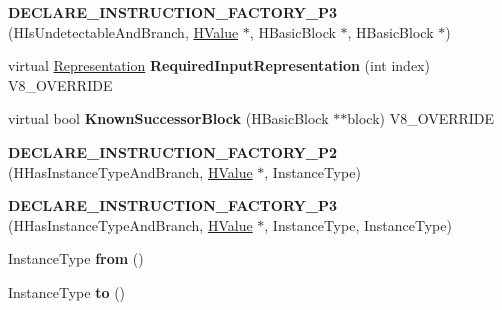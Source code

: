 \begin{DoxyCompactItemize}
\item 
\hypertarget{classv8_1_1internal_1_1_v8___f_i_n_a_l_adf4523d37246896be894f3f44d9a8fee}{}{\bfseries D\+E\+C\+L\+A\+R\+E\+\_\+\+I\+N\+S\+T\+R\+U\+C\+T\+I\+O\+N\+\_\+\+F\+A\+C\+T\+O\+R\+Y\+\_\+\+P3} (H\+Is\+Undetectable\+And\+Branch, \hyperlink{classv8_1_1internal_1_1_h_value}{H\+Value} $\ast$, H\+Basic\+Block $\ast$, H\+Basic\+Block $\ast$)\label{classv8_1_1internal_1_1_v8___f_i_n_a_l_adf4523d37246896be894f3f44d9a8fee}

\item 
\hypertarget{classv8_1_1internal_1_1_v8___f_i_n_a_l_a6c6d1f37f40b113d8f4062f1ffff7215}{}virtual \hyperlink{classv8_1_1internal_1_1_representation}{Representation} {\bfseries Required\+Input\+Representation} (int index) V8\+\_\+\+O\+V\+E\+R\+R\+I\+D\+E\label{classv8_1_1internal_1_1_v8___f_i_n_a_l_a6c6d1f37f40b113d8f4062f1ffff7215}

\item 
\hypertarget{classv8_1_1internal_1_1_v8___f_i_n_a_l_a85ba341b22db01ee3cd7145d9f8e9b99}{}virtual bool {\bfseries Known\+Successor\+Block} (H\+Basic\+Block $\ast$$\ast$block) V8\+\_\+\+O\+V\+E\+R\+R\+I\+D\+E\label{classv8_1_1internal_1_1_v8___f_i_n_a_l_a85ba341b22db01ee3cd7145d9f8e9b99}

\item 
\hypertarget{classv8_1_1internal_1_1_v8___f_i_n_a_l_aeef270c76aa0ac96b9da3146e35046c0}{}{\bfseries D\+E\+C\+L\+A\+R\+E\+\_\+\+I\+N\+S\+T\+R\+U\+C\+T\+I\+O\+N\+\_\+\+F\+A\+C\+T\+O\+R\+Y\+\_\+\+P2} (H\+Has\+Instance\+Type\+And\+Branch, \hyperlink{classv8_1_1internal_1_1_h_value}{H\+Value} $\ast$, Instance\+Type)\label{classv8_1_1internal_1_1_v8___f_i_n_a_l_aeef270c76aa0ac96b9da3146e35046c0}

\item 
\hypertarget{classv8_1_1internal_1_1_v8___f_i_n_a_l_a80143ceb9828cb16f54092a5e70a6afb}{}{\bfseries D\+E\+C\+L\+A\+R\+E\+\_\+\+I\+N\+S\+T\+R\+U\+C\+T\+I\+O\+N\+\_\+\+F\+A\+C\+T\+O\+R\+Y\+\_\+\+P3} (H\+Has\+Instance\+Type\+And\+Branch, \hyperlink{classv8_1_1internal_1_1_h_value}{H\+Value} $\ast$, Instance\+Type, Instance\+Type)\label{classv8_1_1internal_1_1_v8___f_i_n_a_l_a80143ceb9828cb16f54092a5e70a6afb}

\item 
\hypertarget{classv8_1_1internal_1_1_v8___f_i_n_a_l_a724095791225d90653643f7cdf93cc79}{}Instance\+Type {\bfseries from} ()\label{classv8_1_1internal_1_1_v8___f_i_n_a_l_a724095791225d90653643f7cdf93cc79}

\item 
\hypertarget{classv8_1_1internal_1_1_v8___f_i_n_a_l_a4c5d40cfc608c8b0c79c88a20138f7e3}{}Instance\+Type {\bfseries to} ()\label{classv8_1_1internal_1_1_v8___f_i_n_a_l_a4c5d40cfc608c8b0c79c88a20138f7e3}


\end{DoxyCompactItemize}
